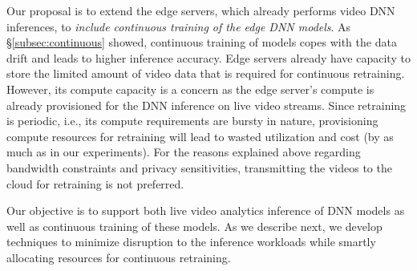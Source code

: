 Our proposal is to extend the edge servers, which already performs video DNN inferences, to {\em include continuous training of the edge DNN models}. As \S\ref{subsec:continuous} showed, continuous training of models copes with the data drift and leads to higher inference accuracy. Edge servers already have capacity to store the limited amount of video data that is required for continuous retraining. However, its compute capacity is a concern as the edge server's compute is already provisioned for the DNN inference on live video streams. Since retraining is periodic, i.e., its compute requirements are bursty in nature, provisioning compute resources for retraining will lead to wasted utilization and cost (by as much as  in our experiments). For the reasons explained above regarding bandwidth constraints and privacy sensitivities, transmitting the videos to the cloud for retraining is not preferred.

Our objective is to support both live video analytics inference of DNN models as well as continuous training of these models. As we describe next, we develop techniques to minimize disruption to the inference workloads while smartly allocating resources for continuous retraining. %


